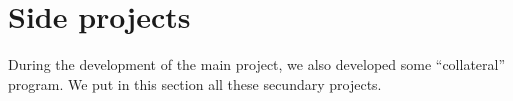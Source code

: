 \chapter{Side projects}\label{cap:SideProjects}
During the development of the main project, we also developed some ``collateral'' program.
We put in this section all these secundary projects.



